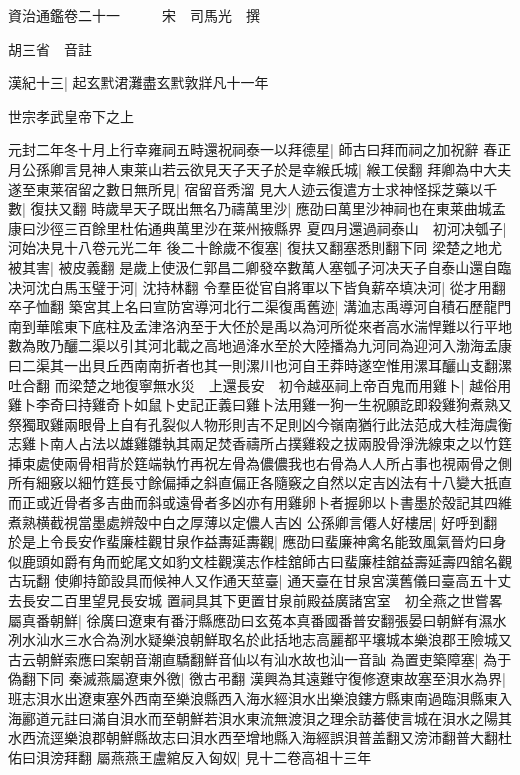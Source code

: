 資治通鑑卷二十一　　　宋　司馬光　撰

胡三省　音註

漢紀十三|{
	起玄黓涒灘盡玄黓敦牂凡十一年}


世宗孝武皇帝下之上

元封二年冬十月上行幸雍祠五畤還祝祠泰一以拜德星|{
	師古曰拜而祠之加祝辭}
春正月公孫卿言見神人東莱山若云欲見天子天子於是幸緱氏城|{
	緱工侯翻}
拜卿為中大夫遂至東莱宿留之數日無所見|{
	宿留音秀溜}
見大人迹云復遣方士求神怪採芝藥以千數|{
	復扶又翻}
時歲旱天子既出無名乃禱萬里沙|{
	應劭曰萬里沙神祠也在東莱曲城孟康曰沙徑三百餘里杜佑通典萬里沙在莱州掖縣界}
夏四月還過祠泰山　初河决瓠子|{
	河始决見十八卷元光二年}
後二十餘歲不復塞|{
	復扶又翻塞悉則翻下同}
梁楚之地尤被其害|{
	被皮義翻}
是歲上使汲仁郭昌二卿發卒數萬人塞瓠子河决天子自泰山還自臨决河沈白馬玉璧于河|{
	沈持林翻}
令羣臣從官自將軍以下皆負薪卒填决河|{
	從才用翻卒子恤翻}
築宮其上名曰宣防宮導河北行二渠復禹舊迹|{
	溝洫志禹導河自積石歷龍門南到華隂東下底柱及孟津洛汭至于大伾於是禹以為河所從來者高水湍悍難以行平地數為敗乃釃二渠以引其河北載之高地過洚水至於大陸播為九河同為迎河入渤海孟康曰二渠其一出貝丘西南南折者也其一則漯川也河自王莽時遂空惟用漯耳釃山支翻漯吐合翻}
而梁楚之地復寧無水災　上還長安　初令越巫祠上帝百鬼而用雞卜|{
	越俗用雞卜李奇曰持雞奇卜如鼠卜史記正義曰雞卜法用雞一狗一生祝願訖即殺雞狗煮熟又祭獨取雞兩眼骨上自有孔裂似人物形則吉不足則凶今嶺南猶行此法范成大桂海虞衡志雞卜南人占法以雄雞雛執其兩足焚香禱所占撲雞殺之拔兩股骨淨洗線束之以竹筳挿束處使兩骨相背於筳端執竹再祝左骨為儂儂我也右骨為人人所占事也視兩骨之側所有細竅以細竹筳長寸餘偏挿之斜直偏正各隨竅之自然以定吉凶法有十八變大扺直而正或近骨者多吉曲而斜或遠骨者多凶亦有用雞卵卜者握卵以卜書墨於殻記其四維煮熟横截視當墨處辨殻中白之厚薄以定儂人吉凶}
公孫卿言僊人好樓居|{
	好呼到翻}
於是上令長安作蜚廉桂觀甘泉作益夀延夀觀|{
	應劭曰蜚廉神禽名能致風氣晉灼曰身似鹿頭如爵有角而蛇尾文如豹文桂觀漢志作桂舘師古曰蜚廉桂舘益壽延壽四舘名觀古玩翻}
使卿持節設具而候神人又作通天莖臺|{
	通天臺在甘泉宮漢舊儀曰臺高五十丈去長安二百里望見長安城}
置祠具其下更置甘泉前殿益廣諸宮室　初全燕之世嘗畧屬真番朝鮮|{
	徐廣曰遼東有番汙縣應劭曰玄菟本真番國番普安翻張晏曰朝鮮有濕水冽水汕水三水合為洌水疑樂浪朝鮮取名於此括地志高麗都平壤城本樂浪郡王險城又古云朝鮮索應曰案朝音潮直驕翻鮮音仙以有汕水故也汕一音訕}
為置吏築障塞|{
	為于偽翻下同}
秦滅燕屬遼東外徼|{
	徼古弔翻}
漢興為其遠難守復修遼東故塞至浿水為界|{
	班志浿水出遼東塞外西南至樂浪縣西入海水經浿水出樂浪鏤方縣東南過臨浿縣東入海酈道元註曰滿自浿水而至朝鮮若浿水東流無渡浿之理余訪蕃使言城在浿水之陽其水西流逕樂浪郡朝鮮縣故志曰浿水西至增地縣入海經誤浿普盖翻又滂沛翻普大翻杜佑曰浿滂拜翻}
屬燕燕王盧綰反入匈奴|{
	見十二卷高祖十三年}
